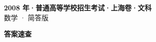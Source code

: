 \documentclass[zihao=-4, a4paper]{ctexart}
\begin{document}
\begin{center}
  {\Large\bfseries 2008 年·普通高等学校招生考试·上海卷·文科}\\[4pt]
  {\large 数学 · 简答版}
\end{center}
\medskip
{}

\clearpage
{}
\begin{center}{\Large\bfseries 答案速查}\end{center}
\medskip

\end{document}
